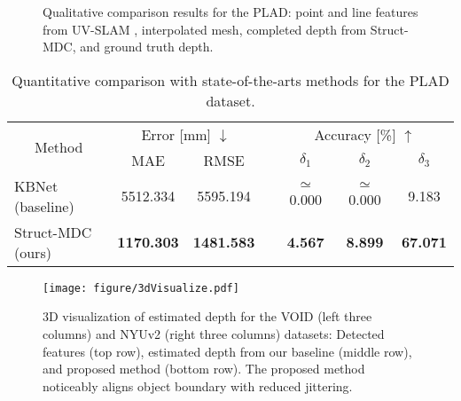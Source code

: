 \begin{figure}[t]
    \centering
    \caption{Qualitative comparison results for the PLAD: 
     point and line features from UV-SLAM \cite{uvslsam}, 
     interpolated mesh, 
     completed depth from Struct-MDC, and 
     ground truth depth.}\label{fig:plad_result}
    \vspace{-0.3cm}
\end{figure}
\begin{table}[!t]
\centering
\renewcommand{\arraystretch}{1.10} \renewcommand{\tabcolsep}{1.0mm}  \caption{Quantitative comparison with state-of-the-art\textcolor{color1}{s methods} for the PLAD \textcolor{color1}{dataset}.
}
\begin{tabular}{lcccccc}
\hline
\multicolumn{1}{c}{\multirow{2}{*}{Method}} & \multicolumn{2}{c}{Error {[}mm{]} $\downarrow$} &  & \multicolumn{3}{c}{Accuracy {[}\%{]} $\uparrow$}  \\ \cline{2-3} \cline{5-7} 
\multicolumn{1}{c}{}                        & MAE                    & RMSE                   &  & $\delta_1$     & $\delta_2$     & $\delta_3$      \\ \hline
\textcolor{color2}{KBNet (baseline)~\cite{baseline}}                            & 5512.334               & 5595.194               &  & $\simeq$ 0.000 & $\simeq$ 0.000 & 9.183           \\
Struct-MDC (ours)                                        & \textbf{1170.303}      & \textbf{1481.583}      &  & \textbf{4.567} & \textbf{8.899} & \textbf{67.071} \\ \hline
\end{tabular}
\label{table:exp_plad}
\end{table}



\begin{figure*}[th!]
\centering
    \texttt{[image: figure/3dVisualize.pdf]}
    \caption{3D visualization of estimated depth for the VOID (left three columns) and NYUv2 (right three columns) \textcolor{color1}{datasets}: Detected features (top row), estimated depth from our baseline (middle row), and proposed method (bottom row). The proposed method \textcolor{color1}{noticeably} aligns object boundary with reduced jittering.} 
    \label{fig:3d_visualize}
    \vspace{-0.4cm}
\end{figure*} 








